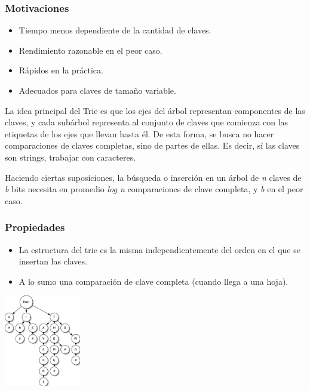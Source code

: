 \subsubsection{Motivaciones}
\begin{itemize}
 \item Tiempo menos dependiente de la cantidad de claves.
 \item Rendimiento razonable en el peor caso.
 \item R\'apidos en la pr\'actica.
 \item Adecuados para claves de tamaño variable.
\end{itemize}

La idea principal del Trie es que los ejes del \'arbol representan componentes de las claves, y cada sub\'arbol representa al conjunto de claves que comienza con las etiquetas de los ejes que llevan hasta \'el. 
De esta forma, se busca no hacer comparaciones de claves completas, sino de partes de ellas. Es decir, s\'i las claves son strings, trabajar con caracteres.

Haciendo ciertas suposiciones, la b\'usqueda o inserci\'on en un \'arbol de \textit{n} claves de \textit{b} bits necesita en promedio \textit{log n} comparaciones de clave completa, y \textit{b} en el peor caso.

\subsubsection{Propiedades}
\begin{itemize}
 \item La estructura del trie es la misma independientemente del orden en el que se insertan las claves.
 \item A lo sumo una comparaci\'on de clave completa (cuando llega a una hoja).
\end{itemize}

\begin{center}
 \includegraphics[width=0.25\textwidth, height=0.3\textwidth]{./graficos/trie-simple.png}
\end{center}

